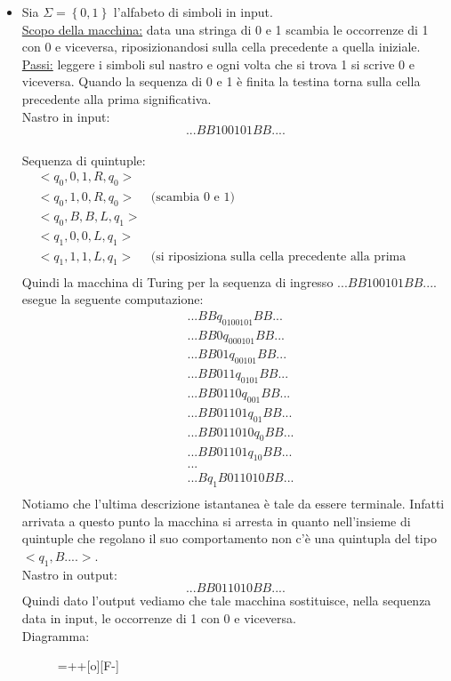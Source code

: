 \begin{itemize}
\item Sia $\Sigma=\left\{0,1\right\}$ l'alfabeto di simboli in
  input. \\\underline{Scopo della macchina:} data una stringa di 0 e 1
  scambia le occorrenze di 1 con 0 e viceversa, riposizionandosi sulla
  cella precedente a quella iniziale.\\ \underline{Passi:} leggere i
  simboli sul nastro e ogni volta che si trova 1 si scrive 0 e
  viceversa. Quando la sequenza di 0 e 1 è finita la testina torna
  sulla cella precedente alla prima significativa.\\

Nastro in input:$$...BB100101BB....$$\\

Sequenza di quintuple:
\begin{eqnarray*}
&<q_0,0,1,R,q_0>&\\
&<q_0,1,0,R,q_0>&\mbox{(scambia 0 e 1)}\\
&<q_0,B,B,L,q_1>&\\
&<q_1,0,0,L,q_1>&\\
&<q_1,1,1,L,q_1>&\mbox{(si riposiziona sulla cella precedente alla prima significativa)}\\
\end{eqnarray*}
Quindi la macchina di Turing per la sequenza di ingresso $...BB100101BB....$ esegue la seguente computazione:
\begin{eqnarray*}
&...BBq_0100101BB...\\
&...BB0q_000101BB...\\
&...BB01q_00101BB...\\
&...BB011q_0101BB...\\
&...BB0110q_001BB...\\
&...BB01101q_01BB...\\
&...BB011010q_0BB...\\
&...BB01101q_10BB...\\
&...\\
&...Bq_1B011010BB...\\
\end{eqnarray*}
Notiamo che l'ultima descrizione istantanea \`e tale da essere
terminale. Infatti arrivata a questo punto la macchina si arresta in
quanto nell'insieme di quintuple che regolano il suo comportamento non
c'\`e una quintupla del tipo $<q_1,B....>$.\\
\vspace{0.3 cm} Nastro in output:$$...BB011010BB....$$ Quindi dato
l'output vediamo che tale macchina sostituisce, nella sequenza data in
input, le occorrenze di 1 con 0 e viceversa.\\
\vspace{0.2cm}
Diagramma:
\begin{figure}[hbtp!]
\hspace{3 cm} \entrymodifiers={++[o][F-]} 
\end{figure}


\end{itemize}
